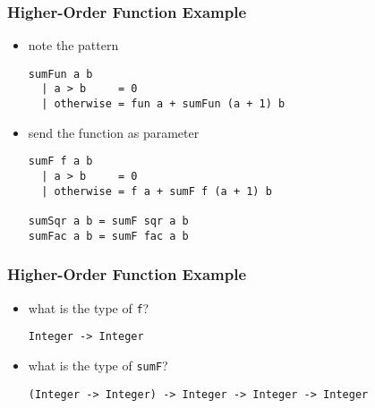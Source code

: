 \documentclass[dvipsnames]{beamer}
\theoremstyle{plain}
\begin{document}
\begin{frame}[fragile]
  \frametitle{Higher-Order Function Example}

  \begin{exampleblock}{}
    \begin{itemize}
      \item note the pattern

      \smallskip
      \begin{lstlisting}
sumFun a b
  | a > b     = 0
  | otherwise = fun a + sumFun (a + 1) b
      \end{lstlisting}
    \end{itemize}
  \end{exampleblock}

  \pause
  \begin{exampleblock}{}
    \begin{itemize}
      \item send the function as parameter

      \smallskip
      \begin{lstlisting}
sumF f a b
  | a > b     = 0
  | otherwise = f a + sumF f (a + 1) b

sumSqr a b = sumF sqr a b
sumFac a b = sumF fac a b
      \end{lstlisting}
    \end{itemize}
  \end{exampleblock}
\end{frame}

\begin{frame}[fragile]
  \frametitle{Higher-Order Function Example}

  \begin{exampleblock}{}
    \begin{itemize}
      \item what is the type of \lstinline|f|?
      \smallskip
      \begin{lstlisting}
Integer -> Integer
      \end{lstlisting}

      \pause
      \item what is the type of \lstinline|sumF|?
      \smallskip
      \begin{lstlisting}
(Integer -> Integer) -> Integer -> Integer -> Integer
      \end{lstlisting}
    \end{itemize}
  \end{exampleblock}
\end{frame}
\end{document}
